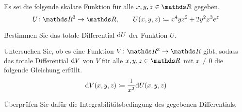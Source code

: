 \begin{atiTask}[
  title = Vollständiges Differential
]
  Es sei die folgende skalare Funktion für alle $x,y,z\in\setR$ gegeben.
  \[
    \func{U}{\setR^3}{\setR}\separate U(x,y,z)\define x^4yz^2 + 2y^2x^3e^z
  \]
  \begin{atiSubtasks}
    \item{
      Bestimmen Sie das totale Differential $\mathrm{d} U$ der Funktion $U$.
    }
    \item{
      Untersuchen Sie, ob es eine Funktion $\func{V}{\setR^3}{\setR}$ gibt, sodass das totale Differential $\mathrm{d} V$ von $V$ für alle $x,y,z\in\setR$ mit $x\neq 0$ die folgende Gleichung erfüllt.
      \[
        \mathrm{d} V(x,y,z)\coloneqq \frac{1}{x^2} \mathrm{d} U(x,y,z)
      \]
      \begin{atiNote}
        Überprüfen Sie dafür die Integrabilitätsbedingung des gegebenen Differentials.
      \end{atiNote}
    }
  \end{atiSubtasks}
\end{atiTask}
